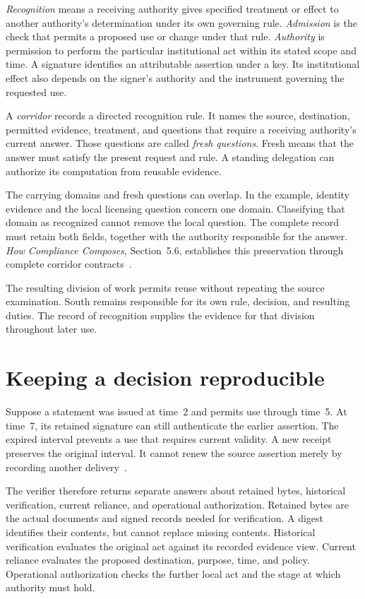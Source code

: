 \documentclass{momentum}
\begin{document}
\emph{Recognition} means a receiving authority gives specified treatment or effect to another authority's determination under its own governing rule.
\emph{Admission} is the check that permits a proposed use or change under that rule.
\emph{Authority} is permission to perform the particular institutional act within its stated scope and time.
A signature identifies an attributable assertion under a key.
Its institutional effect also depends on the signer's authority and the instrument governing the requested use.

A \emph{corridor} records a directed recognition rule.
It names the source, destination, permitted evidence, treatment, and questions that require a receiving authority's current answer.
Those questions are called \emph{fresh questions}.
Fresh means that the answer must satisfy the present request and rule.
A standing delegation can authorize its computation from reusable evidence.

The carrying domains and fresh questions can overlap.
In the example, identity evidence and the local licensing question concern one domain.
Classifying that domain as recognized cannot remove the local question.
The complete record must retain both fields, together with the authority responsible for the answer.
\emph{How Compliance Composes}, Section~5.6, establishes this preservation through complete corridor contracts~\cite{compliance}.

The resulting division of work permits reuse without repeating the source examination.
South remains responsible for its own rule, decision, and resulting duties.
The record of recognition supplies the evidence for that division throughout later use.

\section{Keeping a decision reproducible}
\label{sec:history}

Suppose a statement was issued at time~2 and permits use through time~5.
At time~7, its retained signature can still authenticate the earlier assertion.
The expired interval prevents a use that requires current validity.
A new receipt preserves the original interval.
It cannot renew the source assertion merely by recording another delivery~\cite[Section~2.2, Proposition~2.5]{sjn}.

The verifier therefore returns separate answers about retained bytes, historical verification, current reliance, and operational authorization.
Retained bytes are the actual documents and signed records needed for verification.
A digest identifies their contents, but cannot replace missing contents.
Historical verification evaluates the original act against its recorded evidence view.
Current reliance evaluates the proposed destination, purpose, time, and policy.
Operational authorization checks the further local act and the stage at which authority must hold.
\end{document}
